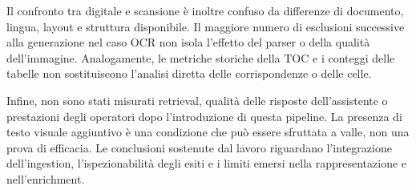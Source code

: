 Il confronto tra digitale e scansione è inoltre confuso da differenze di documento, lingua, layout e struttura disponibile. Il maggiore numero di esclusioni successive alla generazione nel caso OCR non isola l'effetto del parser o della qualità dell'immagine. Analogamente, le metriche storiche della TOC e i conteggi delle tabelle non sostituiscono l'analisi diretta delle corrispondenze o delle celle.

Infine, non sono stati misurati retrieval, qualità delle risposte dell'assistente o prestazioni degli operatori dopo l'introduzione di questa pipeline. La presenza di testo visuale aggiuntivo è una condizione che può essere sfruttata a valle, non una prova di efficacia. Le conclusioni sostenute dal lavoro riguardano l'integrazione dell'ingestion, l'ispezionabilità degli esiti e i limiti emersi nella rappresentazione e nell'enrichment.